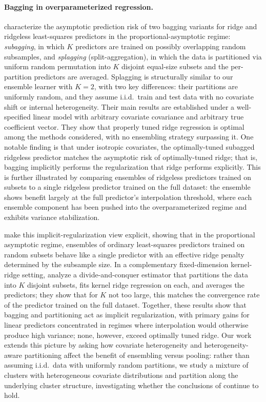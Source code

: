 \documentclass{article}
\theoremstyle{plain}
\theoremstyle{remark}
\begin{document}
\paragraph{Bagging in overparameterized regression.}
\citet{patil2023bagging} characterize the asymptotic prediction risk of two bagging variants for ridge and ridgeless least-squares predictors in the proportional-asymptotic regime: \emph{subagging}, in which $K$ predictors are trained on possibly overlapping random subsamples, and \emph{splagging} (split-aggregation), in which the data is partitioned via uniform random permutation into $K$ disjoint equal-size subsets and the per-partition predictors are averaged. Splagging is structurally similar to our ensemble learner with $K = 2$, with two key differences: their partitions are uniformly random, and they assume i.i.d.\ train and test data with no covariate shift or internal heterogeneity. Their main results are established under a well-specified linear model with arbitrary covariate covariance and arbitrary true coefficient vector. They show that properly tuned ridge regression is optimal among the methods considered, with no ensembling strategy surpassing it. One notable finding is that under isotropic covariates, the optimally-tuned subagged ridgeless predictor matches the asymptotic risk of optimally-tuned ridge; that is, bagging implicitly performs the regularization that ridge performs explicitly. This is further illustrated by comparing ensembles of ridgeless predictors trained on subsets to a single ridgeless predictor trained on the full dataset: the ensemble shows benefit largely at the full predictor's interpolation threshold, where each ensemble component has been pushed into the overparameterized regime and exhibits variance stabilization.

\citet{lejeune2020implicit} make this implicit-regularization view explicit, showing that in the proportional asymptotic regime, ensembles of ordinary least-squares predictors trained on random subsets behave like a single predictor with an effective ridge penalty determined by the subsample size. In a complementary fixed-dimension kernel-ridge setting, \citet{zhang2015divide} analyze a divide-and-conquer estimator that partitions the data into $K$ disjoint subsets, fits kernel ridge regression on each, and averages the predictors; they show that for $K$ not too large, this matches the convergence rate of the predictor trained on the full dataset. Together, these results show that bagging and partitioning act as implicit regularization, with primary gains for linear predictors concentrated in regimes where interpolation would otherwise produce high variance; none, however, exceed optimally tuned ridge. Our work extends this picture by asking how covariate heterogeneity and heterogeneity-aware partitioning affect the benefit of ensembling versus pooling: rather than assuming i.i.d.\ data with uniformly random partitions, we study a mixture of clusters with heterogeneous covariate distributions and partition along the underlying cluster structure, investigating whether the conclusions of \citet{patil2023bagging} continue to hold.
\end{document}
